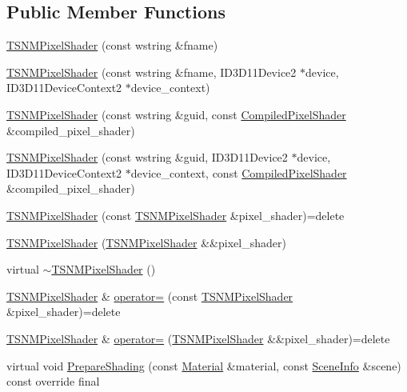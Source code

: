 \subsection*{Public Member Functions}
\begin{DoxyCompactItemize}
\item 
\hyperlink{classmage_1_1_t_s_n_m_pixel_shader_a0081c5ca9470521f2f7d01dfcfe1996d}{T\+S\+N\+M\+Pixel\+Shader} (const wstring \&fname)
\item 
\hyperlink{classmage_1_1_t_s_n_m_pixel_shader_ace6ab7447386a00f2280ddd742dfadef}{T\+S\+N\+M\+Pixel\+Shader} (const wstring \&fname, I\+D3\+D11\+Device2 $\ast$device, I\+D3\+D11\+Device\+Context2 $\ast$device\+\_\+context)
\item 
\hyperlink{classmage_1_1_t_s_n_m_pixel_shader_a7740332d83ccbaf1b99a9c861ff3b137}{T\+S\+N\+M\+Pixel\+Shader} (const wstring \&guid, const \hyperlink{structmage_1_1_compiled_pixel_shader}{Compiled\+Pixel\+Shader} \&compiled\+\_\+pixel\+\_\+shader)
\item 
\hyperlink{classmage_1_1_t_s_n_m_pixel_shader_a1355e9a1e476dadbb3e9a7c1bf260d84}{T\+S\+N\+M\+Pixel\+Shader} (const wstring \&guid, I\+D3\+D11\+Device2 $\ast$device, I\+D3\+D11\+Device\+Context2 $\ast$device\+\_\+context, const \hyperlink{structmage_1_1_compiled_pixel_shader}{Compiled\+Pixel\+Shader} \&compiled\+\_\+pixel\+\_\+shader)
\item 
\hyperlink{classmage_1_1_t_s_n_m_pixel_shader_af01a39116e8759ecd28aaba009c8b8ad}{T\+S\+N\+M\+Pixel\+Shader} (const \hyperlink{classmage_1_1_t_s_n_m_pixel_shader}{T\+S\+N\+M\+Pixel\+Shader} \&pixel\+\_\+shader)=delete
\item 
\hyperlink{classmage_1_1_t_s_n_m_pixel_shader_a4889850bd4ff6c3a3d22c9637752ce37}{T\+S\+N\+M\+Pixel\+Shader} (\hyperlink{classmage_1_1_t_s_n_m_pixel_shader}{T\+S\+N\+M\+Pixel\+Shader} \&\&pixel\+\_\+shader)
\item 
virtual \hyperlink{classmage_1_1_t_s_n_m_pixel_shader_ae7c20ffb872faffb28714b39916e4250}{$\sim$\+T\+S\+N\+M\+Pixel\+Shader} ()
\item 
\hyperlink{classmage_1_1_t_s_n_m_pixel_shader}{T\+S\+N\+M\+Pixel\+Shader} \& \hyperlink{classmage_1_1_t_s_n_m_pixel_shader_a8c9bc92d544b088e9530f8f47df2b4a6}{operator=} (const \hyperlink{classmage_1_1_t_s_n_m_pixel_shader}{T\+S\+N\+M\+Pixel\+Shader} \&pixel\+\_\+shader)=delete
\item 
\hyperlink{classmage_1_1_t_s_n_m_pixel_shader}{T\+S\+N\+M\+Pixel\+Shader} \& \hyperlink{classmage_1_1_t_s_n_m_pixel_shader_a0d714c73017f9bb9b273b2d2a276ab5f}{operator=} (\hyperlink{classmage_1_1_t_s_n_m_pixel_shader}{T\+S\+N\+M\+Pixel\+Shader} \&\&pixel\+\_\+shader)=delete
\item 
virtual void \hyperlink{classmage_1_1_t_s_n_m_pixel_shader_a9b9f44b0cf757061e1c29388c9b20c38}{Prepare\+Shading} (const \hyperlink{structmage_1_1_material}{Material} \&material, const \hyperlink{structmage_1_1_scene_info}{Scene\+Info} \&scene) const override final
\end{DoxyCompactItemize}
